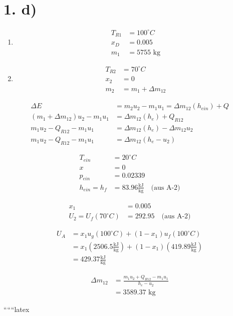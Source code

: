 \section*{1. d)}

\begin{enumerate}
    \item 
    \begin{align*}
        T_{R1} &= 100^\circ C \\
        x_D &= 0.005 \\
        m_1 &= 5755 \text{ kg}
    \end{align*}
    
    \item 
    \begin{align*}
        T_{R2} &= 70^\circ C \\
        x_2 &= 0 \\
        m_2 &= m_1 + \Delta m_{12}
    \end{align*}
\end{enumerate}

\noindent
{}

\begin{align*}
    \Delta E &= m_2 u_2 - m_1 u_1 = \Delta m_{12} (h_{ein}) + Q \\
    (m_1 + \Delta m_{12}) u_2 - m_1 u_1 &= \Delta m_{12} (h_e) + Q_{R12} \\
    m_1 u_2 - Q_{R12} - m_1 u_1 &= \Delta m_{12} (h_e) - \Delta m_{12} u_2 \\
    m_1 u_2 - Q_{R12} - m_1 u_1 &= \Delta m_{12} (h_e - u_2)
\end{align*}

\noindent
{}
\begin{align*}
    T_{ein} &= 20^\circ C \\
    x &= 0 \\
    p_{ein} &= 0.02339 \\
    h_{ein} = h_f &= 83.96 \frac{\text{kJ}}{\text{kg}} \quad \text{(aus A-2)}
\end{align*}

\noindent
{}
\begin{align*}
    x_1 &= 0.005 \\
    U_2 = U_f (70^\circ C) &= 292.95 \quad \text{(aus A-2)}
\end{align*}

\noindent
{}
\begin{align*}
    U_A &= x_1 u_g (100^\circ C) + (1 - x_1) u_f (100^\circ C) \\
    &= x_1 \left( 2506.5 \frac{\text{kJ}}{\text{kg}} \right) + (1 - x_1) \left( 419.89 \frac{\text{kJ}}{\text{kg}} \right) \\
    &= 429.37 \frac{\text{kJ}}{\text{kg}}
\end{align*}

\noindent
{}
\begin{align*}
    \Delta m_{12} &= \frac{m_1 u_2 + Q_{R12} - m_1 u_1}{h_e - u_2} \\
    &= 3589.37 \text{ kg}
\end{align*}

``````latex